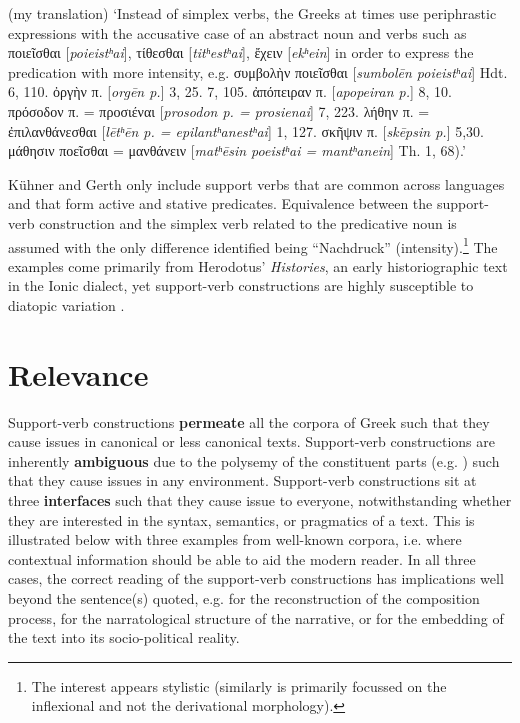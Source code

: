 \documentclass[output=paper,colorlinks,citecolor=brown]{langscibook}
\begin{document}
\bigskip

(my translation) ‘Instead of simplex verbs, the Greeks at times use periphrastic expressions with the accusative case of an abstract noun and verbs such as ποιεῖσθαι [\textit{poieistʰai}], τίθεσθαι [\textit{titʰestʰai}], ἔχειν [\textit{ekʰein}] in order to express the predication with more intensity, e.g. συμβολὴν ποιεῖσθαι [\textit{sumbolēn poieistʰai}] Hdt. 6, 110. ὀργὴν π. [\textit{orgēn p.}]  3, 25. 7, 105. ἀπόπειραν π. [\textit{apopeiran p.}] 8, 10. πρόσοδον π. = προσιέναι [\textit{prosodon p. = prosienai}] 7, 223. λήθην π. = ἐπιλανθάνεσθαι [\textit{lētʰēn p. = epilantʰanestʰai}] 1, 127. σκῆψιν π. [\textit{skēpsin p.}] 5,30. μάθησιν ποεῖσθαι = μανθάνειν [\textit{matʰēsin poeistʰai = mantʰanein}] Th. 1, 68).’

\z


Kühner and Gerth only include support verbs that are common across languages and that form active and stative predicates. Equivalence between the support-verb construction and the simplex verb related to the predicative noun is assumed with the only difference identified being “Nachdruck” (intensity).\footnote{The interest appears stylistic (similarly \citealt{aertsPeriphrasticaInvestigationUse1965} is primarily focussed on the inflexional and not the derivational morphology).}  The examples come primarily from Herodotus’ \textit{Histories}, an early historiographic text in the Ionic dialect, yet support-verb constructions are highly susceptible to diatopic variation \citep{fendelTakingStockGreek2024}.



\section{Relevance}
Support-verb constructions \textbf{permeate} all the corpora of Greek such that they cause issues in canonical or less canonical texts. Support-verb constructions are inherently \textbf{ambiguous} due to the polysemy of the constituent parts (e.g. \citealt{savaryLiteralOccurrencesMultiword2019}) such that they cause issues in any environment. Support-verb constructions sit at three \textbf{interfaces} such that they cause issue to everyone, notwithstanding whether they are interested in the syntax, semantics, or pragmatics of a text. This is illustrated below with three examples from well-known corpora, i.e. where contextual information should be able to aid the modern reader. In all three cases, the correct reading of the support-verb constructions has implications well beyond the sentence(s) quoted, e.g. for the reconstruction of the composition process, for the narratological structure of the narrative, or for the embedding of the text into its socio-political reality. 
\end{document}
